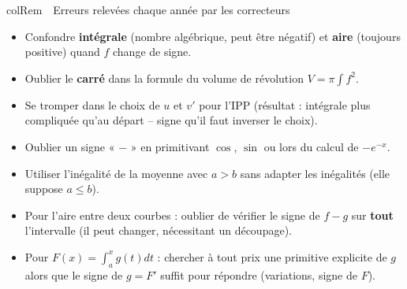 \documentclass[11pt,a4paper]{article}
\newenvironment{remarque}[1][Remarque]
  {\begin{fiche}{colRem}{\ding{43}~~#1}}{\end{fiche}}
\begin{document}
\begin{remarque}[Erreurs relevées chaque année par les correcteurs]
\begin{itemize}[leftmargin=6mm, itemsep=0.5mm]
  \item Confondre \textbf{intégrale} (nombre algébrique, peut être négatif) et \textbf{aire} (toujours positive) quand $f$ change de signe.
  \item Oublier le \textbf{carré} dans la formule du volume de révolution $V=\pi\int f^2$.
  \item Se tromper dans le choix de $u$ et $v'$ pour l'IPP (résultat : intégrale plus compliquée qu'au départ -- signe qu'il faut inverser le choix).
  \item Oublier un signe « $-$ » en primitivant $\cos$, $\sin$ ou lors du calcul de $-e^{-x}$.
  \item Utiliser l'inégalité de la moyenne avec $a>b$ sans adapter les inégalités (elle suppose $a\leq b$).
  \item Pour l'aire entre deux courbes : oublier de vérifier le signe de $f-g$ sur \textbf{tout} l'intervalle (il peut changer, nécessitant un découpage).
  \item Pour $F(x)=\int_a^xg(t)dt$ : chercher à tout prix une primitive explicite de $g$ alors que le signe de $g=F'$ suffit pour répondre (variations, signe de $F$).
\end{itemize}
\end{remarque}
\end{document}
